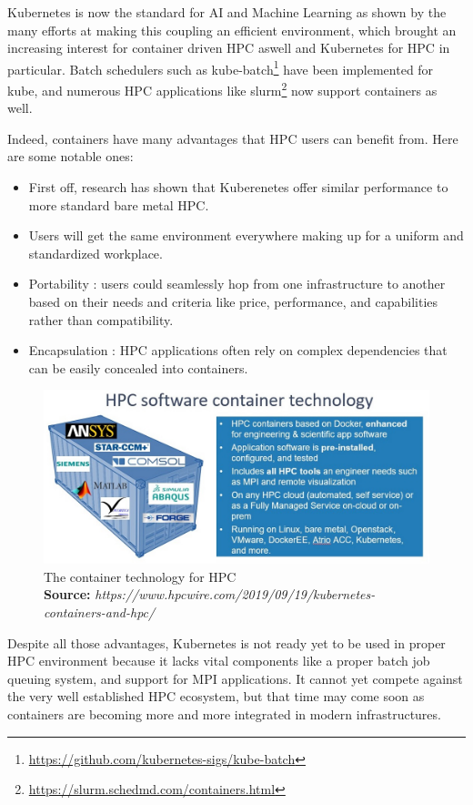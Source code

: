\documentclass[12pt, a4paper]{memoir}
\newcommand*{\captionsource}[2]{%
    \caption[{#1}]{%
        #1%
        \\\hspace{\linewidth}%
	\textbf{Source:} \textit{#2}%
    }%
}
\begin{document}
Kubernetes is now the standard for AI and Machine Learning as shown by the many
efforts at making this coupling an efficient
environment\cite{lee2017design}\cite{233001}\cite{10.1145/3154842.3154845},
which brought an increasing interest for container driven HPC aswell and
Kubernetes for HPC in particular. Batch schedulers such as
kube-batch\footnote{\url{https://github.com/kubernetes-sigs/kube-batch}} have
been implemented for kube, and numerous HPC applications like
slurm\footnote{\url{https://slurm.schedmd.com/containers.html}} now support containers as well.

Indeed, containers have many advantages that HPC users can benefit from. Here
are some notable ones:
\begin{itemize}
	\item First off, research has shown that Kuberenetes offer similar
		performance to more standard bare metal HPC\cite{8950981}.
	\item Users will get the same environment everywhere making up for a
		uniform and standardized workplace.
	\item Portability : users could seamlessly hop from one infrastructure
		to another based on their needs and criteria like price,
		performance, and capabilities rather than compatibility.
	\item Encapsulation : HPC applications often rely on complex
		dependencies that can be easily concealed into containers.
\end{itemize}
\begin{figure}[h]
	\centering
	\includegraphics[scale=0.5]{./imgs/hpc-container.jpg}
	\captionsource{The container technology for HPC}{https://www.hpcwire.com/2019/09/19/kubernetes-containers-and-hpc/}
	\label{fig:hpc-container}
\end{figure}

Despite all those advantages, Kubernetes is not ready yet to be used in proper
HPC environment because it lacks vital components like a proper batch job
queuing system, and support for MPI applications. It cannot yet compete against
the very well established HPC ecosystem, but that time may come soon as
containers are becoming more and more integrated in modern infrastructures.
\end{document}
